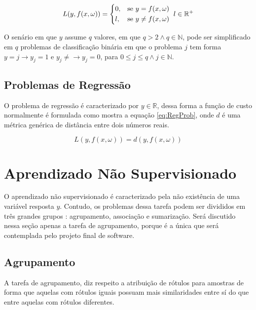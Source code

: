 \begin{equation}
{	
	 L(y, f(x, \omega)) = \begin{dcases*}
	0,  & se $y = f(x, \omega)$ \\
	l,  & se $y \ne f(x, \omega)$ 
	\end{dcases*} \\ 
	l \in \mathbb {R^+}
}
\label{eq:ClassProb}
\end{equation}

O senário em que $y$ assume $q$ valores, em que $q > 2 \land q \in \mathbb {N}$, pode ser simplificado em $q$ problemas de classificação binária em que o problema $j$ tem forma $y = j \rightarrow y_j = 1$ e $y_j \neq  \rightarrow y_j = 0 $, para $ 0 \leq j \leq q \land j \in \mathbb {N}$.

\subsection{Problemas de Regressão}
O problema de regressão é caracterizado por $y \in \mathbb {R}$, dessa forma a função de custo normalmente é formulada como mostra a equação \ref{eq:RegProb}, onde $d$ é uma métrica genérica de distância entre dois números reais.

\begin{equation}
L(y, f(x, \omega)) = d(y, f(x, \omega))
\label{eq:RegProb}
\end{equation}

\section{Aprendizado Não Supervisionado}

O aprendizado não supervisionado é caracterizado pela não existência de uma variável resposta $y$. Contudo, os problemas dessa tarefa podem ser divididos em três grandes grupos : agrupamento, associação e sumarização. Será discutido nessa seção apenas a tarefa de agrupamento, porque é a única que será contemplada pelo projeto final de software.

\subsection{Agrupamento}
A tarefa de agrupamento, diz respeito a atribuição de rótulos para amostras de forma que aquelas com rótulos iguais possuam mais similaridades entre sí do que entre aquelas com rótulos diferentes. 


